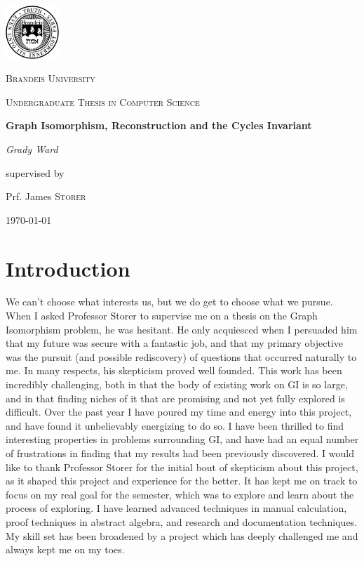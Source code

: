 \documentclass[11pt,a4paper]{report}
\begin{document}
\begin{titlepage}
	\centering
	\includegraphics[width=0.15\textwidth]{brandeis-seal}\par\vspace{1cm}
	{\scshape\LARGE Brandeis University \par}
	\vspace{1cm}
	{\scshape\Large Undergraduate Thesis in Computer Science\par}
	\vspace{1.5cm}
	{\huge\bfseries Graph Isomorphism, Reconstruction and the Cycles Invariant\par}
	\vspace{2cm}
	{\Large\itshape Grady Ward\par}
	\vfill
	supervised by\par
	Prf. James \textsc{Storer}
	\vfill

	{\large \today\par}
\end{titlepage}

\tableofcontents

\chapter*{Introduction}
We can't choose what interests us, but we do get to choose what we pursue.
When I asked Professor Storer to supervise me on a thesis on the Graph Isomorphism problem, he was hesitant.
He only acquiesced when I persuaded him that my future was secure with a fantastic job, and that my primary objective was the pursuit (and possible rediscovery) of questions that occurred naturally to me.
In many respects, his skepticism proved well founded.
This work has been incredibly challenging, both in that the body of existing work on GI is so large, and in that finding niches of it that are promising and not yet fully explored is difficult.
Over the past year I have poured my time and energy into this project, and have found it unbelievably energizing to do so.
I have been thrilled to find interesting properties in problems surrounding GI, and have had an equal number of frustrations in finding that my results had been previously discovered.
I would like to thank Professor Storer for the initial bout of skepticism about this project, as it shaped this project and experience for the better.
It has kept me on track to focus on my real goal for the semester, which was to explore and learn about the process of exploring.
I have learned advanced techniques in manual calculation, proof techniques in abstract algebra, and research and documentation techniques.
My skill set has been broadened by a project which has deeply challenged me and always kept me on my toes.
\end{document}
